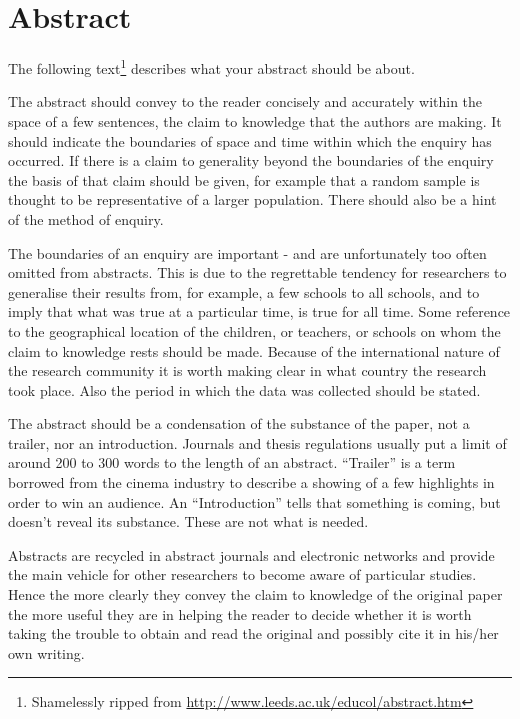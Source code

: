 \documentclass[a4paper,12pt,twoside,openany,headsepline,bibliography=totocnumbered]{scrbook}
\begin{document}


\section*{Abstract}
The following text\footnote{Shamelessly ripped from \url{http://www.leeds.ac.uk/educol/abstract.htm}} describes what your abstract should be about.

The abstract should convey to the reader concisely and accurately within the space of a few sentences, the claim to knowledge that the authors are making. It should indicate the boundaries of space and time within which the enquiry has occurred. If there is a claim to generality beyond the boundaries of the enquiry the basis of that claim should be given, for example that a random sample is thought to be representative of a larger population. There should also be a hint of the method of enquiry.

The boundaries of an enquiry are important - and are unfortunately too often omitted from abstracts. This is due to the regrettable tendency for researchers to generalise their results from, for example, a few schools to all schools, and to imply that what was true at a particular time, is true for all time. Some reference to the geographical location of the children, or teachers, or schools on whom the claim to knowledge rests should be made. Because of the international nature of the research community it is worth making clear in what country the research took place. Also the period in which the data was collected should be stated.

The abstract should be a condensation of the substance of the paper, not a trailer, nor an introduction. Journals and thesis regulations usually put a limit of around 200 to 300 words to the length of an abstract. “Trailer” is a term borrowed from the cinema industry to describe a showing of a few highlights in order to win an audience. An “Introduction” tells that something is coming, but doesn’t reveal its substance. These are not what is needed.

Abstracts are recycled in abstract journals and electronic networks and provide the main vehicle for other researchers to become aware of particular studies. Hence the more clearly they convey the claim to knowledge of the original paper the more useful they are in helping the reader to decide whether it is worth taking the trouble to obtain and read the original and possibly cite it in his/her own writing.
\end{document}
